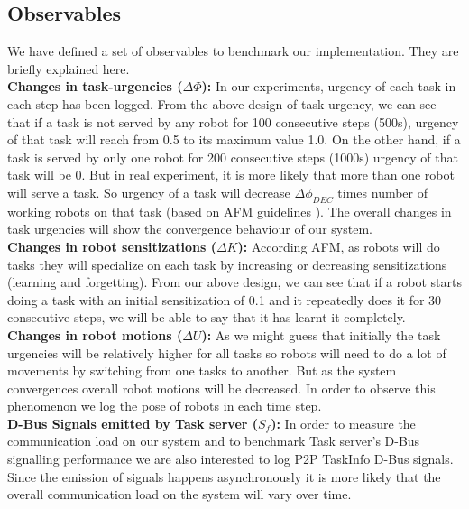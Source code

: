 \documentclass[letterpaper, 10 pt, conference]{ieeeconf}  %
\begin{document}
\subsection{Observables}
We have defined a set of observables to benchmark our implementation. They are briefly explained here.\\
\textbf{Changes in task-urgencies ($\Delta \Phi$): }
In our experiments, urgency of each task in each step has been logged. From the above design of task urgency, we can see that if a task is not served by any robot for 100 consecutive steps (500s), urgency of that task will reach from 0.5 to its maximum value 1.0. On the other hand, if a task is served by only one robot for 200 consecutive steps (1000s) urgency of that task will be 0. But in real experiment, it is more likely that more than one robot will serve a task. So urgency of a task will decrease $\Delta\phi_{DEC}$ times number of working robots on that task (based on AFM guidelines \cite{Elsa}). The overall changes in task urgencies will show the convergence behaviour of our system.\\
\textbf{Changes in robot sensitizations ($\Delta K$): }
According AFM, as robots will do tasks they will specialize on each task by increasing or decreasing sensitizations (learning and forgetting). From our above design, we can see that if a robot starts doing a task with an initial sensitization of 0.1 and it repeatedly does it for 30 consecutive steps, we will be able to say that it has learnt it completely.\\
\textbf{Changes in robot motions ($\Delta U$): }
As we might guess that initially the task urgencies will be relatively higher for all tasks so robots will need to do a lot of movements by switching from one tasks to another. But as the system convergences overall robot motions will be decreased. In order to observe this phenomenon we log the pose of robots in each time step.\\
\textbf{D-Bus Signals emitted by Task server ($S_f$):} 
In order to measure the communication load on our system and to benchmark Task server's D-Bus signalling performance we are also interested to log P2P TaskInfo D-Bus signals. Since the emission of signals happens asynchronously it is more likely that the overall communication load on the system will vary over time.
\end{document}
